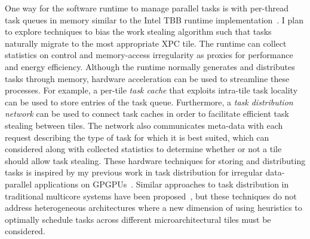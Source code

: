 One way for the software runtime to manage parallel tasks is with
per-thread task queues in memory similar to the Intel TBB runtime
implementation~\cite{reinders-tbb-book2007}.
I plan to explore techniques to bias the work stealing algorithm such
that tasks naturally migrate to the most appropriate XPC tile. The
runtime can collect statistics on control and memory-access irregularity
as proxies for performance and energy efficiency.
Although the runtime normally generates and distributes tasks through
memory, hardware acceleration can be used to streamline these
processes. For example, a per-tile \emph{task cache} that exploits
intra-tile task locality can be used to store entries of the task queue.
Furthermore, a \emph{task distribution network} can be used to
connect task caches in order to facilitate efficient task stealing
between tiles.
The network also communicates meta-data with each request describing the
type of task for which it is best suited, which can considered along with
collected statistics to determine whether or not a tile should allow task
stealing. These hardware techniques for storing and distributing tasks is
inspired by my previous work in task distribution for irregular
data-parallel applications on GPGPUs~\cite{kim-hwwl-micro2014}.  Similar
approaches to task distribution in traditional multicore systems have
been proposed~\cite{kumar-carbon-isca2007,sanchez-adm-asplos2010}, but
these techniques do not address heterogeneous architectures where a new
dimension of using heuristics to optimally schedule tasks across
different microarchitectural tiles must be considered.
